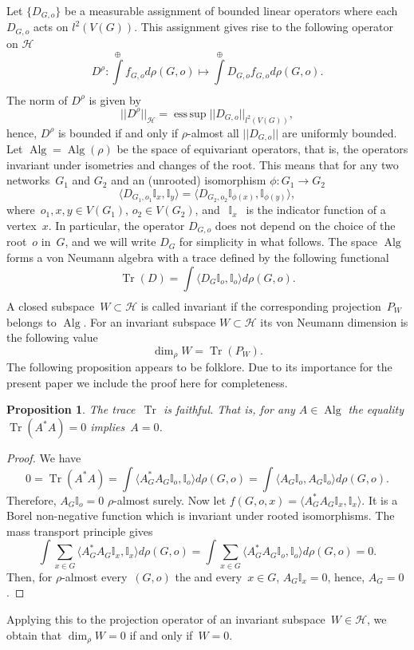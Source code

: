 \documentclass[english]{article}
\newtheorem{proposition}[lemma]{Proposition}
\theoremstyle{definition}
\DeclareMathOperator{\Alg}{Alg} %
\DeclareMathOperator{\Tr}{Tr} %
\DeclareMathOperator{\esssup}{ess\,sup} %
\DeclareMathOperator{\I}{{\mathbb{I}}}
\DeclareMathOperator{\Gr}{{\mathcal{G}_*}}
\begin{document}
Let $\{D_{G,o}\}$ be a measurable assignment of bounded linear operators where each $D_{G,o}$ acts on $l^2(V(G))$. This assignment gives rise to the following operator on $\mathcal{H}$
$$
D^\rho \colon \int\limits^{\oplus}_{\Gr} f_{G,o} d \rho(G,o) \mapsto \int\limits^{\oplus}_{\Gr} D_{G,o} f_{{G,o}} d \rho(G,o).
$$
The norm of $D^\rho$ is given by
$$
||D^\rho||_\mathcal{H} = \esssup ||D_{G,o}||_{l^2(V(G))},
$$
hence, $D^\rho$ is bounded if and only if $\rho$-almost all $||D_{G,o}||$ are uniformly bounded. 
Let $\Alg = \Alg(\rho)$ be the space of equivariant operators, that is, the operators invariant under isometries and changes of the root. This means that for any two networks~$G_1$ and $G_2$ and an (unrooted) isomorphism $\phi \colon G_1 \to G_2$
$$
\langle D_{G_1, o_1} \mathbb I _x , \mathbb I_y \rangle = 
\langle D_{G_2, o_2} \mathbb I_{\phi(x)} , \mathbb I_{\phi(y)} \rangle,
$$
where~$o_1, x, y \in V(G_1)$, $o_2 \in V(G_2)$, and~$\I_x$~is the indicator function of a vertex~$x$. In particular, the operator $D_{G,o}$ does not depend on the choice of the root~$o$ in~$G$, and we will write $D_G$ for simplicity in what follows. The space $\Alg$ forms a von Neumann algebra with a trace defined by the following functional 
$$
\Tr (D) = \int\limits_{\Gr} \langle D_{G} \mathbb I _o , \mathbb I_o \rangle d \rho(G,o).
$$
A closed subspace~$W \subset \mathcal{H}$ is called invariant if the corresponding projection~$P_W$ belongs to $\Alg$.
For an invariant subspace $W \subset \mathcal{H}$ its von Neumann dimension is the following value
$$
\dim_\rho W = \Tr(P_W).
$$
The following proposition appears to be folklore. Due to its importance for the present paper we include the proof here for completeness. 
\begin{proposition}%
    The trace~$\Tr$ is faithful. That is, for any $A \in \Alg$ the equality $\Tr(A^*A) = 0$ implies~$A =0$.
\end{proposition}
\begin{proof}
    We have 
    $$
    0 = \Tr(A^*A) = \int \langle A_G^*A_G \mathbb I_o, \mathbb I_o\rangle d \rho(G,o) = \int \langle A_G \mathbb I_o, A_G \mathbb I_o\rangle d \rho(G,o).
    $$
    Therefore, $A_G \mathbb I_o = 0$ $\rho$-almost surely. Now let $f(G,o,x) = \langle A_G^*A_G \mathbb I _x, \mathbb I_x\rangle$. It is a Borel non-negative function which is invariant under rooted isomorphisms. The mass transport principle gives 
    $$
    \int \sum_{x \in G} \langle A_G^*A_G \mathbb I_x, \mathbb I_x\rangle d \rho(G,o)=
    \int \sum_{x \in G} \langle A_G^*A_G \mathbb I_o, \mathbb I_o\rangle d \rho(G,o) = 0.
    $$
    Then, for $\rho$-almost every~$(G,o)$ the and every~$x \in G$, $A_G\mathbb I_x =0$, hence, $A_G = 0$.
\end{proof}
Applying this to the projection operator of an invariant subspace~$W \in \mathcal{H}$, we obtain that $\dim_\rho W = 0$ if and only if~$W =0$.
\end{document}
